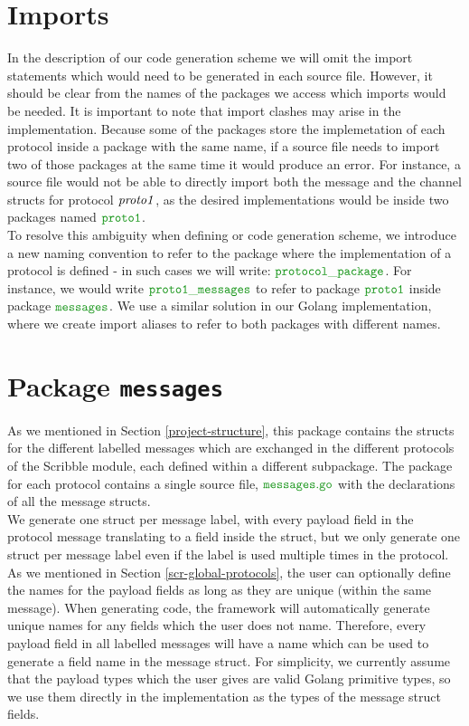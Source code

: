 \documentclass[12pt,twoside]{report}
\begin{document}
\section{Imports}
In the description of our code generation scheme we will omit the import statements which would need to be generated in each source file. However, it should be clear from the names of the packages we access which imports would be needed. It is important to note that import clashes may arise in the implementation. Because some of the packages store the implemetation of each protocol inside a package with the same name, if a source file needs to import two of those packages at the same time it would produce an error. For instance, a source file would not be able to directly import both the message and the channel structs for protocol ${\mathit{proto1}}$, as the desired implementations would be inside two packages named $\pkgname{proto1}$.\\

To resolve this ambiguity when defining or code generation scheme, we introduce a new naming convention to refer to the package where the implementation of a protocol is defined - in such cases we will write: $\pkgname{protocol\_package}$. For instance, we would write $\pkgname{proto1\_messages}$ to refer to package $\pkgname{proto1}$ inside package $\pkgname{messages}$. We use a similar solution in our Golang implementation, where we create import aliases to refer to both packages with different names.\\


\section{Package \texttt{messages}}
As we mentioned in Section \ref{project-structure}, 
this package contains the structs for the different labelled messages which are exchanged in the different protocols of the Scribble module, each defined within a different subpackage. The package for each protocol contains a single source file, $\filename{messages}$ with the declarations of all the message structs.\\

We generate one struct per message label, with every payload field in the protocol message translating to a field inside the struct, but we only generate one struct per message label even if the label is used multiple times in the protocol. As we mentioned in Section \ref{scr-global-protocols}, the user can optionally define the names for the payload fields as long as they are unique (within the same message). When generating code, the framework will automatically generate unique names for any fields which the user does not name. Therefore, every payload field in all labelled messages will have a name which can be used to generate a field name in the message struct. For simplicity, we currently assume that the payload types which the user gives are valid Golang primitive types, so we use them directly in the implementation as the types of the message struct fields.
\end{document}

